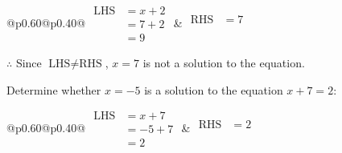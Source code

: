 \documentclass[12pt]{article}
\newcounter{minipagecount}
\begin{document}
\begin{multicols}{2}
\begin{minipage}[t]{0.40\textwidth}
    \noindent
    \renewcommand{\arraystretch}{1.3} %
    \begin{tabular}{@{}p{0.60\linewidth}@{}p{0.40\linewidth}@{}}
        \(\begin{aligned}
            \text{LHS} &= x + 2 \\
                    &= 7 + 2 \\
                    &= 9 
        \end{aligned}\) &
        \(\begin{aligned}
            \text{RHS} &= 7\\
                    & \\
                    &
        \end{aligned}\)
    \end{tabular}
    \renewcommand{\arraystretch}{1.0} %
    \vspace{2pt}  %

    \noindent \(\therefore\) Since \(\text{LHS} \neq \text{RHS}\), \(x = 7\) is not  a solution to the equation.

\end{minipage}

 \vspace*{16pt}
\noindent{(\theminipagecount)}\hspace{0.1mm} %
\begin{minipage}[t]{0.40\textwidth} %

    \noindent Determine whether \(x = -5\) is a solution to the equation \(x + 7 = 2\):
    \vspace{4pt}  %

    \noindent
    \renewcommand{\arraystretch}{1.3} %
    \begin{tabular}{@{}p{0.60\linewidth}@{}p{0.40\linewidth}@{}}
        \(\begin{aligned}
            \text{LHS} &= x + 7 \\
                    &= -5 + 7 \\
                    &= 2 
        \end{aligned}\) &
        \(\begin{aligned}
            \text{RHS} &= 2\\
                    & \\
                    &
        \end{aligned}\)
    \end{tabular}
    \renewcommand{\arraystretch}{1.0} %
    \vspace{2pt}  %


\end{minipage}
\end{multicols}
\end{document}
